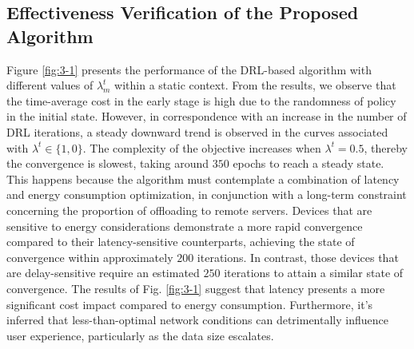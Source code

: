 \documentclass[journal]{IEEEtran}
\begin{document}
\subsection{Effectiveness Verification of the Proposed Algorithm}
Figure \ref{fig:3-1} presents the performance of the DRL-based algorithm with different values of $\lambda_m^t$ within a static context.
From the results, we observe that the time-average cost in the early stage is high due to the randomness of policy in the initial state.
However, in correspondence with an increase in the number of DRL iterations, a steady downward trend is observed in the curves associated with $\lambda^t\in\{1, 0\}$.
The complexity of the objective increases when $\lambda^t=0.5$, thereby the convergence is slowest, taking around $350$ epochs to reach a steady state.
This happens because the algorithm must contemplate a combination of latency and energy consumption optimization, in conjunction with a long-term constraint concerning the proportion of offloading to remote servers.
Devices that are sensitive to energy considerations demonstrate a more rapid convergence compared to their latency-sensitive counterparts, achieving the state of convergence within approximately $200$ iterations.
In contrast, those devices that are delay-sensitive require an estimated $250$ iterations to attain a similar state of convergence.
The results of Fig. \ref{fig:3-1}  suggest that latency presents a more significant cost impact compared to energy consumption.
Furthermore, it's inferred that less-than-optimal network conditions can detrimentally influence user experience, particularly as the data size escalates.
\end{document}
